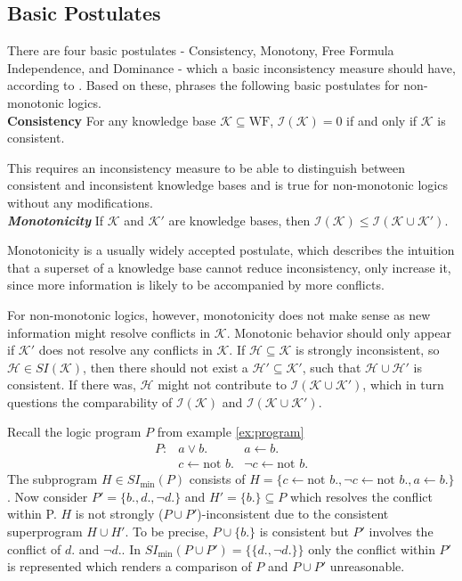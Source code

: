 \subsection{Basic Postulates}
There are four basic postulates - Consistency, Monotony, Free Formula Independence, and Dominance - which a basic inconsistency measure should have, according to \cite{hunter_measure_2010}. Based on these, \cite{ulbricht_handling_2020} phrases the following basic postulates for non-monotonic logics.
\\
\textbf{Consistency}
For any knowledge base \(\mathcal{K} \subseteq \text{WF}\), \(\mathcal{I}(\mathcal{K}) = 0\) if and only if \(\mathcal{K}\) is consistent.

This requires an inconsistency measure to be able to distinguish between consistent and inconsistent knowledge bases and is true for non-monotonic logics without any modifications.
\\
\textit{\textbf{Monotonicity}}
If \(\mathcal{K}\) and \(\mathcal{K}'\) are knowledge bases, then \(\mathcal{I}(\mathcal{K}) \leq \mathcal{I}(\mathcal{K \cup \mathcal{K}'})\).

Monotonicity is a usually widely accepted postulate, which describes the intuition that a superset of a knowledge base cannot reduce inconsistency, only increase it, since more information is likely to be accompanied by more conflicts.

For non-monotonic logics, however, monotonicity does not make sense as new information might resolve conflicts in \(\mathcal{K}\). Monotonic behavior should only appear if \(\mathcal{K}'\) does not resolve any conflicts in \(\mathcal{K}\). If \(\mathcal{H} \subseteq \mathcal{K}\) is strongly inconsistent, so \(\mathcal{H} \in SI(\mathcal{K})\), then there should not exist a \(\mathcal{H}' \subseteq \mathcal{K}'\), such that \(\mathcal{H} \cup \mathcal{H}'\) is consistent. If there was, \(\mathcal{H}\) might not contribute to \(\mathcal{I}(\mathcal{K} \cup \mathcal{K}')\), which in turn questions the comparability of \(\mathcal{I}(\mathcal{K})\) and \(\mathcal{I}(\mathcal{K} \cup \mathcal{K}')\).

\begin{example}
    Recall the logic program \(P\) from example \ref{ex:program}
    \[\begin{array}{rrr}
            P: & a \lor b.                  & a \leftarrow b.                 \\
               & c \leftarrow \text{not }b. & \neg c \leftarrow \text{not }b.
        \end{array}\]
    The subprogram \(H \in SI_{\min}(P)\) consists of \(H = \{c \leftarrow \text{not }b., \neg c \leftarrow \text{not }b., a \leftarrow b.\}\). Now consider \(P' = \{b., d., \neg d.\}\) and \(H' = \{b.\} \subseteq P\) which resolves the conflict within P. \(H\) is not strongly (\(P \cup P'\))-inconsistent due to the consistent superprogram \(H \cup H'\). To be precise, \(P \cup \{b.\}\) is consistent but \(P'\) involves the conflict of \(d.\) and \(\neg d.\). In \(SI_{\min}(P \cup P') = \{\{d., \neg d.\}\}\) only the conflict within \(P'\) is represented which renders a comparison of \(P\) and \(P \cup P'\) unreasonable.
\end{example}

